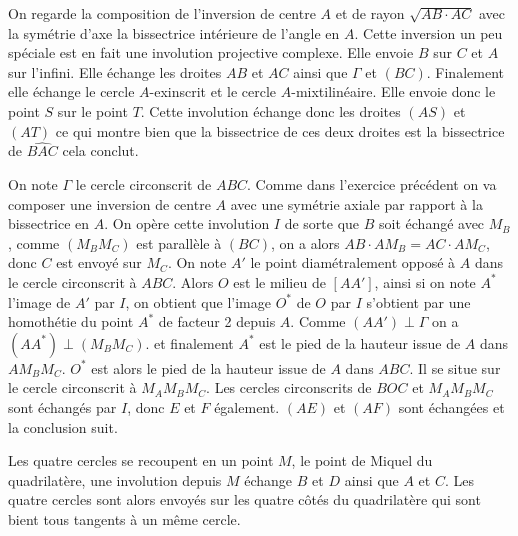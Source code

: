 \begin{sol}
On regarde la composition de l'inversion de centre $A$ et de rayon $\sqrt{AB \cdot AC}$ avec la symétrie d'axe la bissectrice intérieure de l'angle en $A$. Cette inversion un peu spéciale est en fait une involution projective complexe. Elle envoie $B$ sur $C$ et $A$ sur l'infini. Elle échange les droites $AB$ et $AC$ ainsi que $\Gamma$ et $(BC)$. Finalement elle échange le cercle $A$-exinscrit et le cercle $A$-mixtilinéaire. Elle envoie donc le point $S$ sur le point $T$. Cette involution échange donc les droites $(AS)$ et $(AT)$ ce qui montre bien que la bissectrice de ces deux droites est la bissectrice de $\widehat{BAC}$ cela conclut.
\end{sol}

\begin{sol}
On note $\Gamma$ le cercle circonscrit de $ABC$.
Comme dans l'exercice précédent on va composer une inversion de centre $A$ avec une symétrie axiale par rapport à la bissectrice en $A$. On opère cette involution $I$ de sorte que $B$ soit échangé avec $M_B$, comme $(M_BM_C)$ est parallèle à $(BC)$, on a alors $AB\cdot AM_B=AC \cdot AM_C$, donc $C$ est envoyé sur $M_C$.
On note $A'$ le point diamétralement opposé à $A$ dans le cercle circonscrit à $ABC$. Alors $O$ est le milieu de $[AA']$, ainsi si on note $A^*$ l'image de $A'$ par $I$, on obtient que l'image $O^*$ de $O$ par $I$ s'obtient par une homothétie du point $A^*$ de facteur 2 depuis $A$. Comme $(AA')\perp \Gamma$ on a $(AA^*)\perp (M_BM_C)$. et finalement $A^*$ est le pied de la hauteur issue de $A$ dans $AM_BM_C$. $O^*$ est alors le pied de la hauteur issue de $A$ dans $ABC$. Il se situe sur le cercle circonscrit à $M_AM_BM_C$. Les cercles circonscrits de $BOC$ et $M_AM_BM_C$ sont échangés par $I$, donc $E$ et $F$ également. $(AE)$ et $(AF)$ sont échangées et la conclusion suit.
\end{sol}

\begin{sol}
Les quatre cercles se recoupent en un point $M$, le point de Miquel du quadrilatère, une involution depuis $M$ échange $B$ et $D$ ainsi que $A$ et $C$. Les quatre cercles sont alors envoyés sur les quatre côtés du quadrilatère qui sont bient tous tangents à un même cercle.
\end{sol}

